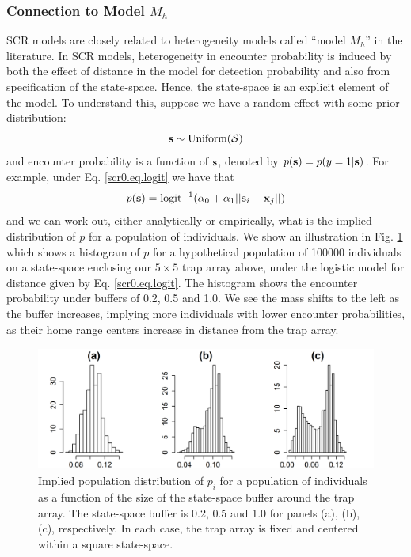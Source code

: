 \subsubsection{Connection to Model  $M_h$}  \label{scr0.sec.scrmh}

SCR models are closely related to heterogeneity models called ``model
$M_h$'' in the literature. In SCR models,
heterogeneity in encounter probability is induced by both the effect
of distance in the model for detection probability and also from
specification of the state-space. Hence, the state-space  is an
explicit element of the model.
To understand this, suppose we have a random
effect %
with some prior distribution:
\[
{\bf s} \sim \mbox{Uniform}({\cal S})
\]
and encounter probability is a function of ${\bf s}$, denoted by
 $p({\bf s}) = p(y=1|{\bf s})$.
For example, under Eq. \ref{scr0.eq.logit}
we have that
\[
p({\bf s}) = \mbox{logit}^{-1} ( \alpha_{0} + \alpha_1 ||{\bf
  s}_{i}-{\bf x}_{j} || )
\]
and we can work out, either analytically or empirically, what is the
implied distribution of $p$ for a population of individuals.  We show
an illustration in Fig. \ref{scr0.fig.buffereffect} which shows a
histogram of $p$ for a hypothetical population of 100000 individuals
on a state-space enclosing our $5 \times 5$ trap array above, under
the logistic model for distance given by Eq. \ref{scr0.eq.logit}.
The
histogram shows the encounter probability under buffers of 0.2, 0.5
and 1.0. We see the mass shifts to the left as the buffer increases,
implying more individuals with lower encounter probabilities, as their
home range centers increase in distance from the trap array.

\begin{figure}[ht]
\begin{center}
\includegraphics[width=4.5in,height=1.6in]{Ch4-SCR0/figs/Mh_buffer}
\end{center}
\caption{Implied population distribution of $p_{i}$ for a population
  of individuals as a function of the size of the state-space buffer
around the trap array. The state-space buffer is 0.2, 0.5 and 1.0 for
panels (a), (b), (c), respectively.
In each case, the trap array is fixed and centered within a
  square state-space.
}
\label{scr0.fig.buffereffect}
\end{figure}

